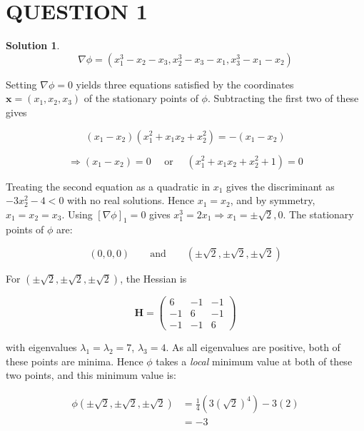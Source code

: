 \documentclass[a4paper]{article}
\newtheorem*{soln}{Solution}
\begin{document}
	
\maketitle

\section{QUESTION 1}

\begin{soln}
\[ \nabla \phi = (x_{1}^{3} - x_{2} - x_{3}, x_{2}^{3} - x_{3} - x_{1}, x_{3}^{3} - x_{1} - x_{2}) \]
\end{soln}

Setting $ \nabla \phi = 0 $ yields three equations satisfied by the coordinates $ \mathbf{x} = (x_{1},x_{2},x_{3}) $ of the stationary points of $ \phi $. Subtracting the first two of these gives

\[ (x_{1} - x_{2})(x_{1}^{2} + x_{1}x_{2} + x_{2}^{2}) = -(x_{1}-x_{2}) \]

\[ \Rightarrow (x_{1} - x_{2}) = 0 \quad \text{ or } \quad (x_{1}^{2} + x_{1}x_{2} + x_{2}^{2} + 1) = 0  \]

Treating the second equation as a quadratic in $ x_{1} $ gives the discriminant as $ -3x_{2}^{2} - 4  < 0 $ with no real solutions. Hence $ x_{1} = x_{2} $, and by symmetry, $ x_{1} = x_{2} = x_{3} $. Using  $ [\nabla \phi]_{1} = 0 $ gives $ x_{1}^{3} = 2 x_{1}  \Rightarrow x_{1} = \pm \sqrt{2}, 0 $. The stationary points of $ \phi $ are:

\[ (0,0,0) \qquad \text{and} \qquad (\pm \sqrt{2},\pm \sqrt{2},\pm \sqrt{2}) \]


For $ (\pm \sqrt{2},\pm \sqrt{2},\pm \sqrt{2}) $, the Hessian is 

\[ \mathbf{H} = \begin{pmatrix}
6 & -1 & -1 \\
-1 & 6 & -1 \\
-1 & -1 & 6 
\end{pmatrix} \]

with eigenvalues $ \lambda_{1} = \lambda_{2} = 7 $, $ \lambda_{3} = 4 $.
As all eigenvalues are positive, both of these points are minima. Hence $ \phi $ takes a \emph{local} minimum value at both of these two points, and this minimum value is:

\begin{align*}
\phi (\pm \sqrt{2},\pm \sqrt{2},\pm \sqrt{2}) & = \frac{1}{4}( 3  (\sqrt{2})^{4} ) - 3(2)\\
& = -3
\end{align*}
\end{document}
